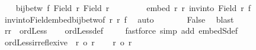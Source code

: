 \begin{isabellebody}
\isanewline
\ \ \isacommand{{\isacharbraceleft}{\kern0pt}}\isamarkupfalse%
\isamarkupfalse%
\ {\isachardoublequoteopen}bij{\isacharunderscore}{\kern0pt}betw\ f\ {\isacharparenleft}{\kern0pt}Field\ r{\isacharparenright}{\kern0pt}\ {\isacharparenleft}{\kern0pt}Field\ r{\isacharprime}{\kern0pt}{\isacharparenright}{\kern0pt}{\isachardoublequoteclose}\isanewline
\ \ \ \isamarkupfalse%
\ {\isacharasterisk}{\kern0pt}\ {}\ \isamarkupfalse%
\ {\isachardoublequoteopen}embed\ r{\isacharprime}{\kern0pt}\ r\ {\isacharparenleft}{\kern0pt}inv{\isacharunderscore}{\kern0pt}into\ {\isacharparenleft}{\kern0pt}Field\ r{\isacharparenright}{\kern0pt}\ f{\isacharparenright}{\kern0pt}\ {\isachardoublequoteclose}\isanewline
\ \ \ \isamarkupfalse%
\ inv{\isacharunderscore}{\kern0pt}into{\isacharunderscore}{\kern0pt}Field{\isacharunderscore}{\kern0pt}embed{\isacharunderscore}{\kern0pt}bij{\isacharunderscore}{\kern0pt}betw{\isacharbrackleft}{\kern0pt}of\ r\ r{\isacharprime}{\kern0pt}\ f{\isacharbrackright}{\kern0pt}\ \isamarkupfalse%
\ auto\isanewline
\ \ \ \isamarkupfalse%
\ {\isacharasterisk}{\kern0pt}\ \isamarkupfalse%
\ False\ \isamarkupfalse%
\ blast\isanewline
\ \ \isacommand{{\isacharbraceright}{\kern0pt}}\isamarkupfalse%
\isanewline
\ \ \isamarkupfalse%
\ \isamarkupfalse%
\ {\isachardoublequoteopen}{\isacharparenleft}{\kern0pt}r{\isacharcomma}{\kern0pt}r{\isacharprime}{\kern0pt}{\isacharparenright}{\kern0pt}\ {\isasymin}\ ordLess{\isachardoublequoteclose}\isanewline
\ \ \isamarkupfalse%
\ ordLess{\isacharunderscore}{\kern0pt}def\ \isamarkupfalse%
\ {\isacharasterisk}{\kern0pt}\ \isamarkupfalse%
\ {\isacharparenleft}{\kern0pt}fastforce\ simp\ add{\isacharcolon}{\kern0pt}\ embedS{\isacharunderscore}{\kern0pt}def{\isacharparenright}{\kern0pt}\isanewline
{}\isamarkupfalse%
%
\endisatagproof
{\isafoldproof}%
%
\isadelimproof
\isanewline
%
\endisadelimproof
\isanewline
{}\isamarkupfalse%
\ ordLess{\isacharunderscore}{\kern0pt}irreflexive{\isacharcolon}{\kern0pt}\ {\isachardoublequoteopen}{\isasymnot}\ r\ {\isacharless}{\kern0pt}o\ r{\isachardoublequoteclose}\isanewline
%
\isadelimproof
%
\endisadelimproof
%
\isatagproof
{}\isamarkupfalse%
\isanewline
\ \ \isamarkupfalse%
\ {\isachardoublequoteopen}r\ {\isacharless}{\kern0pt}o\ r{\isachardoublequoteclose}\isanewline
\ \ \isamarkupfalse%

\end{isabellebody}
